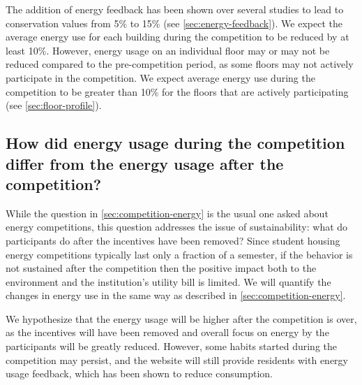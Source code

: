 The addition of energy feedback has been shown over several studies to lead to conservation values from 5\% to 15\% (see \autoref{sec:energy-feedback}). We expect the average energy use for each building during the competition to be reduced by at least 10\%. However, energy usage on an individual floor may or may not be reduced compared to the pre-competition period, as some floors may not actively participate in the competition. We expect average energy use during the competition to be greater than 10\% for the floors that are actively participating (see \autoref{sec:floor-profile}).

\subsection[How did energy use change after the competition?]{How did energy usage during the competition differ from the energy usage after the competition?}
\label{sec:post-competition-energy}

While the question in \autoref{sec:competition-energy} is the usual one asked about energy competitions, this question addresses the issue of sustainability: what do participants do after the incentives have been removed? Since student housing energy competitions typically last only a fraction of a semester, if the behavior is not sustained after the competition then the positive impact both to the environment and the institution's utility bill is limited. We will quantify the changes in energy use in the same way as described in \autoref{sec:competition-energy}.

We hypothesize that the energy usage will be higher after the competition is over, as the incentives will have been removed and overall focus on energy by the participants will be greatly reduced. However, some habits started during the competition may persist, and the website will still provide residents with energy usage feedback, which has been shown to reduce consumption.

%

